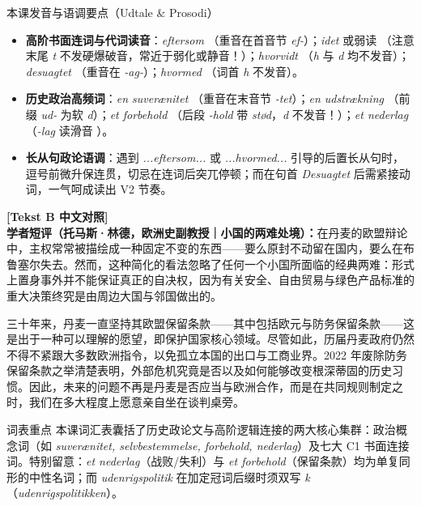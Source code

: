 \begin{tipbox}{本课发音与语调要点（Udtale \& Prosodi）}
\begin{itemize}
  \item \textbf{高阶书面连词与代词读音}：\textit{eftersom} （重音在首音节 \textit{ef-}）；\textit{idet}  或弱读 （注意末尾 \textit{t} 不发硬爆破音，常近于弱化或静音！）；\textit{hvorvidt} （\textit{h} 与 \textit{d} 均不发音）；\textit{desuagtet} （重音在 \textit{-ag-}）；\textit{hvormed} （词首 \textit{h} 不发音）。
  \item \textbf{历史政治高频词}：\textit{en suverænitet} （重音在末音节 \textit{-tet}）；\textit{en udstrækning} （前缀 \textit{ud-} 为软 \textit{d}）；\textit{et forbehold} （后段 \textit{-hold} 带 \textit{stød}，\textit{d} 不发音！）；\textit{et nederlag} （\textit{-lag} 读滑音 ）。
  \item \textbf{长从句政论语调}：遇到 \textit{...eftersom...} 或 \textit{...hvormed...} 引导的后置长从句时，逗号前微升保连贯，切忌在连词后突兀停顿；而在句首 \textit{Desuagtet} 后需紧接动词，一气呵成读出 V2 节奏。
\end{itemize}
\end{tipbox}

\begin{transbox}
\small
\textbf{\color{NCDTeal}[Tekst B 中文对照]}\\
\textbf{学者短评（托马斯·林德，欧洲史副教授｜小国的两难处境）：}在丹麦的欧盟辩论中，主权常常被描绘成一种固定不变的东西——要么原封不动留在国内，要么在布鲁塞尔失去。然而，这种简化的看法忽略了任何一个小国所面临的经典两难：形式上置身事外并不能保证真正的自决权，因为有关安全、自由贸易与绿色产品标准的重大决策终究是由周边大国与邻国做出的。

三十年来，丹麦一直坚持其欧盟保留条款——其中包括欧元与防务保留条款——这是出于一种可以理解的愿望，即保护国家核心领域。尽管如此，历届丹麦政府仍然不得不紧跟大多数欧洲指令，以免孤立本国的出口与工商业界。2022 年废除防务保留条款之举清楚表明，外部危机究竟是否以及如何能够改变根深蒂固的历史习惯。因此，未来的问题不再是丹麦是否应当与欧洲合作，而是在共同规则制定之时，我们在多大程度上愿意亲自坐在谈判桌旁。
\end{transbox}


\begin{tipbox}{词表重点}
本课词汇表囊括了历史政论文与高阶逻辑连接的两大核心集群：政治概念词（如 \textit{suverænitet, selvbestemmelse, forbehold, nederlag}）及七大 C1 书面连接词。特别留意：\textit{et nederlag}（战败/失利）与 \textit{et forbehold}（保留条款）均为单复同形的中性名词；而 \textit{udenrigspolitik} 在加定冠词后缀时须双写 \textit{k}（\textit{udenrigspolitikken}）。
\end{tipbox}

